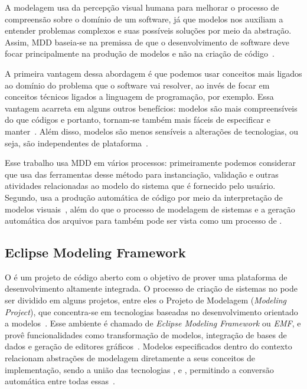 A modelagem usa da percepção visual humana para melhorar o processo de compreensão sobre o domínio de um software, já que modelos nos auxiliam a entender problemas complexos e suas possíveis soluções por meio da abstração. Assim, MDD baseia-se na premissa de que o desenvolvimento de software deve focar principalmente na produção de modelos e não na criação de código~\cite{selic2003pragmatics}.

A primeira vantagem dessa abordagem é que podemos usar conceitos mais ligados ao domínio do problema que o software vai resolver, ao invés de focar em conceitos técnicos ligados a linguagem de programação, por exemplo. Essa vantagem acarreta em alguns outros benefícios: modelos são mais compreensíveis do que códigos e portanto, tornam-se também mais fáceis de especificar e manter~\cite{selic2003pragmatics}. Além disso, modelos são menos sensíveis a alterações de tecnologias, ou seja, são independentes de plataforma~\cite{selic2003pragmatics}. 

Esse trabalho usa MDD em vários processos: primeiramente podemos considerar que \zanshin usa das ferramentas desse método para instanciação, validação e outras atividades relacionadas ao modelo do sistema que é fornecido pelo usuário. Segundo, \unagi usa a produção automática de código por meio da interpretação de modelos visuais~\cite{selic2003pragmatics, viyovic2014sirius}, além do que  o processo de modelagem de sistemas e a geração automática dos arquivos \xml para \zanshin também pode ser vista como um processo de \mdd.


\subsection{Eclipse Modeling Framework}
O \eclipse é um projeto de código aberto com o objetivo de prover uma plataforma de desenvolvimento altamente integrada. O processo de criação de sistemas no \eclipse pode ser dividido em alguns projetos, entre eles o Projeto de Modelagem (\textit{Modeling Project}), que concentra-se em tecnologias baseadas no desenvolvimento orientado a modelos~\cite{steinberg2008emf}. Esse ambiente é chamado de \textit{Eclipse Modeling Framework} ou \textit{EMF}, e provê funcionalidades como transformação de modelos, integração de bases de dados e geração de editores gráficos~\cite{steinberg2008emf}. Modelos especificados dentro do contexto \emf relacionam abstrações de modelagem diretamente a seus conceitos de implementação, sendo a união das tecnologias \uml, \xml e \java, permitindo a conversão automática entre todas essas~\cite{steinberg2008emf}. 

